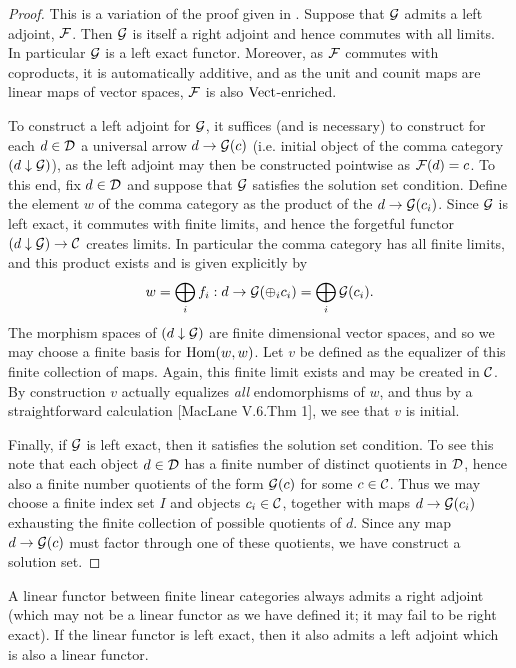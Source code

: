 \documentclass{amsart}
\begin{document}
\begin{proof} This is a variation of the proof given in \cite[V.6.Thm 2]{MR0354798}.
Suppose that $\mathcal G$ admits a left adjoint, $\mathcal F$. Then $\mathcal G$ is itself a right adjoint and hence commutes with all limits. In particular $\mathcal G$ is a left exact functor. Moreover, as $\mathcal F$ commutes with coproducts, it is automatically additive, and as the unit and counit maps are linear maps of vector spaces, $\mathcal F$ is also ${\mathrm{Vect}}$-enriched. 


To construct a left adjoint for $\mathcal G$, it suffices (and is necessary) to construct for each $d \in \mathcal D$ a universal arrow $d \to \mathcal G(c)$ (i.e. initial object of the comma category $(d \downarrow \mathcal G)$),
as the left adjoint may then be constructed pointwise as $\mathcal F(d) = c$. To this end, fix $d \in \mathcal D$ and suppose that $\mathcal G$ satisfies the solution set condition. Define the element $w$ of the comma category as the product of the $d \to \mathcal G(c_i)$. Since $\mathcal G$ is left exact, it commutes with finite limits, and hence the forgetful functor $(d \downarrow \mathcal G) \to \mathcal C$ creates limits. In particular the comma category has all finite limits, and this  product exists and is given explicitly by 
\begin{equation*}
	w = \bigoplus_i f_i :  d \to \mathcal G( \oplus_i c_i) = \bigoplus_i \mathcal G(c_i).
\end{equation*}
The morphism spaces of $(d \downarrow \mathcal G)$ are finite dimensional vector spaces, and so we may choose a finite basis for $\operatorname{Hom}(w,w)$. Let $v$ be defined as the equalizer of this finite collection of maps. Again, this finite limit exists and may be created in $\mathcal C$. By construction $v$ actually equalizes {\em all} endomorphisms of $w$, and thus by a straightforward calculation [MacLane V.6.Thm 1], we see that $v$ is initial. 

Finally, if $\mathcal G$ is left exact, then it satisfies the solution set condition. To see this note that each object $d \in \mathcal D$  has a finite number of distinct quotients in $\mathcal D$, hence also a finite number quotients of the form  $\mathcal G(c)$ for some $c \in \mathcal C$. Thus we may choose a finite index set $I$ and objects  $c_i \in \mathcal C$, together with maps $d \to \mathcal G(c_i)$ exhausting the finite collection of possible quotients of $d$. Since any map $d \to \mathcal G(c)$ must factor through one of these quotients, we have construct a solution set.   
\end{proof}

\begin{corollary}
	A linear functor between finite linear categories always admits a right adjoint (which may not be a linear functor as we have defined it; it may fail to be right exact). If the linear functor is left exact, then it also admits a left adjoint which is also a linear functor. 
\end{corollary}
\end{document}
